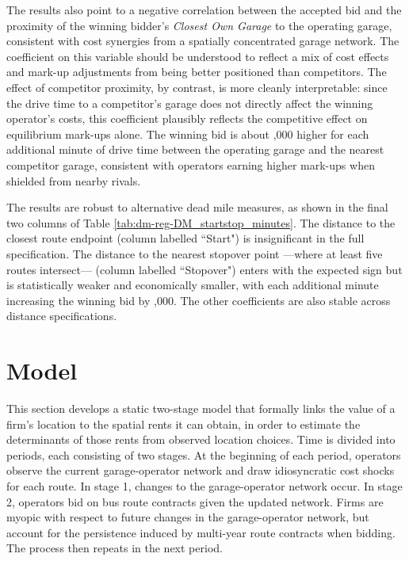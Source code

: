 \documentclass[12pt]{article}
\begin{document}
The results also point to a negative correlation between the accepted bid and 
the proximity of the winning bidder's \emph{Closest Own Garage} to the 
operating garage, consistent with cost synergies from a spatially concentrated 
garage network. The coefficient on this variable should be understood to reflect 
a mix of cost effects and mark-up adjustments from being better positioned than 
competitors. The effect of competitor proximity, by contrast, is more cleanly 
interpretable: since the drive time to a competitor's garage does not directly 
affect the winning operator's costs, this coefficient plausibly reflects the 
competitive effect on equilibrium mark-ups alone. The winning bid is about 
,000 higher for each additional minute of drive time between 
the operating garage and the nearest competitor garage, consistent with 
operators earning higher mark-ups when shielded from nearby rivals.

The results are robust to alternative dead mile measures, as shown in the final 
two columns of Table \ref{tab:dm-reg-DM_startstop_minutes}. The distance to the 
closest route endpoint (column labelled ``Start") is insignificant in the full specification. The distance 
to the nearest stopover point ---where at least five routes intersect--- (column labelled ``Stopover") enters with 
the expected sign but is statistically weaker  and economically smaller, with 
each additional minute increasing the winning bid by ,000. The other coefficients are also stable across distance specifications. 

\section{Model}\label{S:Model}
This section develops a static two-stage model that formally links the value 
of a firm's location to the spatial rents it can obtain, in order to estimate 
the determinants of those rents from observed location choices. Time is divided 
into periods, each consisting of two stages. At the beginning of each period, operators observe 
the current garage-operator network and draw idiosyncratic cost shocks for each 
route. In stage 1, changes to the garage-operator network occur. In stage 2, 
operators bid on bus route contracts given the updated network. Firms are 
myopic with respect to future changes in the garage-operator network, but 
account for the persistence induced by multi-year route contracts when bidding. 
The process then repeats in the next period.
\end{document}
